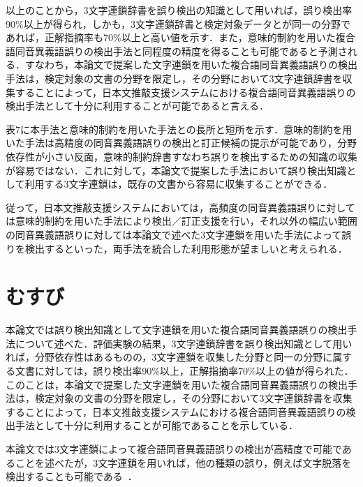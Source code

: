 以上のことから，3文字連鎖辞書を誤り検出の知識として用いれば，誤り検出率90\%以上が得られ，しかも，3文字連鎖辞書と検定対象データとが同一の分野であれば，正解指摘率も70\%以上と高い値を示す．また，意味的制約を用いた複合語同音異義語誤りの検出手法と同程度の精度を得ることも可能であると予測される．すなわち，本論文で提案した文字連鎖を用いた複合語同音異義語誤りの検出手法は，検定対象の文書の分野を限定し，その分野において3文字連鎖辞書を収集することによって，日本文推敲支援システムにおける複合語同音異義語誤りの検出手法として十分に利用することが可能であると言える．

\clearpage
{}

\smallskip
\indent
表7に本手法と意味的制約を用いた手法との長所と短所を示す．意味的制約を用いた手法は高精度の同音異義語誤りの検出と訂正候補の提示が可能であり，分野依存性が小さい反面，意味的制約辞書すなわち誤りを検出するための知識の収集が容易ではない．これに対して，本論文で提案した手法において誤り検出知識として利用する3文字連鎖は，既存の文書から容易に収集することができる．

従って，日本文推敲支援システムにおいては，高頻度の同音異義語誤りに対しては意味的制約を用いた手法により検出／訂正支援を行い，それ以外の幅広い範囲の同音異義語誤りに対しては本論文で述べた3文字連鎖を用いた手法によって誤りを検出するといった，両手法を統合した利用形態が望ましいと考えられる．

\begin{figure}
\begin{center}
\end{center}
\end{figure}



\section{むすび}
本論文では誤り検出知識として文字連鎖を用いた複合語同音異義語誤りの検出手法について述べた．評価実験の結果，3文字連鎖辞書を誤り検出知識として用いれば，分野依存性はあるものの，3文字連鎖を収集した分野と同一の分野に属する文書に対しては，誤り検出率90\%以上，正解指摘率70\%以上の値が得られた．
このことは，本論文で提案した文字連鎖を用いた複合語同音異義語誤りの検出手法は，検定対象の文書の分野を限定し，その分野において3文字連鎖辞書を収集することによって，日本文推敲支援システムにおける複合語同音異義語誤りの検出手法として十分に利用することが可能であることを示している．

本論文では3文字連鎖によって複合語同音異義語誤りの検出が高精度で可能であることを述べたが，3文字連鎖を用いれば，他の種類の誤り，例えば文字脱落を検出することも可能である~\cite{MatsuokaAndTakagi1989}．




